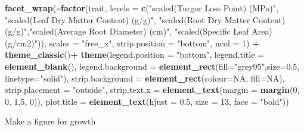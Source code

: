 \documentclass[
]{article}
\newenvironment{Shaded}{\begin{snugshade}}{\end{snugshade}}
\newcommand{\DataTypeTok}[1]{\textcolor[rgb]{0.13,0.29,0.53}{#1}}
\newcommand{\DecValTok}[1]{\textcolor[rgb]{0.00,0.00,0.81}{#1}}
\newcommand{\FloatTok}[1]{\textcolor[rgb]{0.00,0.00,0.81}{#1}}
\newcommand{\KeywordTok}[1]{\textcolor[rgb]{0.13,0.29,0.53}{\textbf{#1}}}
\newcommand{\NormalTok}[1]{#1}
\newcommand{\OperatorTok}[1]{\textcolor[rgb]{0.81,0.36,0.00}{\textbf{#1}}}
\newcommand{\OtherTok}[1]{\textcolor[rgb]{0.56,0.35,0.01}{#1}}
\newcommand{\StringTok}[1]{\textcolor[rgb]{0.31,0.60,0.02}{#1}}
\begin{document}
\begin{Shaded}
\begin{Highlighting}[]
\StringTok{  }\KeywordTok{facet\_wrap}\NormalTok{(}\OperatorTok{\textasciitilde{}}\KeywordTok{factor}\NormalTok{(trait, }\DataTypeTok{levels =} \KeywordTok{c}\NormalTok{(}\StringTok{"scaled(Turgor Loss Point) (MPa)"}\NormalTok{, }\StringTok{"scaled(Leaf Dry Matter Content) (g/g)"}\NormalTok{, }\StringTok{"scaled(Root Dry Matter Content) (g/g)"}\NormalTok{,}\StringTok{"scaled(Average Root Diameter) (cm)"}\NormalTok{, }\StringTok{"scaled(Specific Leaf Area) (g/cm2)"}\NormalTok{)), }\DataTypeTok{scales =} \StringTok{"free\_x"}\NormalTok{, }\DataTypeTok{strip.position =}  \StringTok{"bottom"}\NormalTok{, }\DataTypeTok{ncol =} \DecValTok{1}\NormalTok{) }\OperatorTok{+}
\StringTok{  }\KeywordTok{theme\_classic}\NormalTok{()}\OperatorTok{+}
\StringTok{  }\KeywordTok{theme}\NormalTok{(}\DataTypeTok{legend.position =} \StringTok{"bottom"}\NormalTok{, }\DataTypeTok{legend.title =} \KeywordTok{element\_blank}\NormalTok{(), }\DataTypeTok{legend.background =} \KeywordTok{element\_rect}\NormalTok{(}\DataTypeTok{fill=}\StringTok{"grey95"}\NormalTok{,}\DataTypeTok{size=}\FloatTok{0.5}\NormalTok{, }\DataTypeTok{linetype=}\StringTok{"solid"}\NormalTok{), }\DataTypeTok{strip.background =} \KeywordTok{element\_rect}\NormalTok{(}\DataTypeTok{colour=}\OtherTok{NA}\NormalTok{, }\DataTypeTok{fill=}\OtherTok{NA}\NormalTok{), }\DataTypeTok{strip.placement =} \StringTok{"outside"}\NormalTok{, }\DataTypeTok{strip.text.x =} \KeywordTok{element\_text}\NormalTok{(}\DataTypeTok{margin =} \KeywordTok{margin}\NormalTok{(}\DecValTok{0}\NormalTok{, }\DecValTok{0}\NormalTok{, }\FloatTok{1.5}\NormalTok{, }\DecValTok{0}\NormalTok{)), }\DataTypeTok{plot.title =} \KeywordTok{element\_text}\NormalTok{(}\DataTypeTok{hjust =} \FloatTok{0.5}\NormalTok{, }\DataTypeTok{size =} \DecValTok{13}\NormalTok{, }\DataTypeTok{face =} \StringTok{"bold"}\NormalTok{))}
\end{Highlighting}
\end{Shaded}

Make a figure for growth
\end{document}
